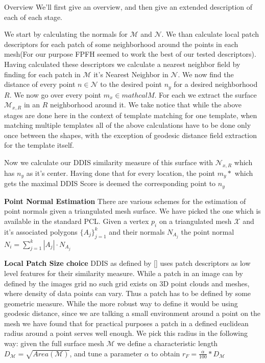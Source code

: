 \documentclass[10pt,twocolumn,letterpaper]{article}
\begin{document}
{\color{red} Overview}
We'll first give an overview, and then give an extended description of each of each stage. 

We start by calculating the normals for $\mathcal{M}$ and $\mathcal{N}$.
We than calculate local patch descriptors for each patch of some neighborhood around the points in each mesh(For our purpose FPFH seemed to work the best of our tested descriptors). 
Having calculated these descriptors we calculate a nearest neighbor field by finding for each patch in $\mathcal{M}$ it's Nearest Neighbor in $\mathcal{N}$. 
We now find the distance of every point $n\in \mathcal{N}$ to the desired point $n_y$ for a desired neighborhood $R$.
 We now go over every point $m_x\in mathcal{M}$. For each we extract the surface $\mathcal{M}_{x,R}$ in an $R$ neighborhood around it.
 We take notice that while the above stages are done here in the context of template matching for one template, when matching multiple templates all of the above calculations have to be done only once between the shapes, with the exception of geodesic distance field extraction for the template itself.
 
 Now we calculate our DDIS similarity measure of this surface with $\mathcal{N}_{x,R}$ which has $n_y$ as it's center. Having done that for every location, the point $m_y*$  which gets the maximal DDIS Score is deemed the corresponding point to $n_y$


\textbf{Point Normal Estimation}
There are various schemes for the estimation of point normals given a triangulated mesh surface. We have picked the one which is available in the standard PCL. Given a vertex $p_i$ on a triangulated mesh $\mathcal{X}$ and it's associated polygons $\{A_j\}_{j=1}^k$ and their normals $N_{A_j}$ the point normal $N_i = \sum_{j=1}^k{|A_j|\cdot N_{A_j}}$

\textbf{Local Patch Size choice}
DDIS as defined by [] uses patch descriptors as low level features for their similarity measure. While a patch in an image can by defined by the images grid no such grid exists on 3D point clouds and meshes, where density of data points can vary. Thus a patch has to be defined by some geometric measure. While the more robust way to define it would be using geodesic distance, since we are talking a small environment around a point on the mesh we have found that for practical purposes a patch in a defined euclidean radius around a point serves well enough. We pick this radius in the following way: given the full surface mesh $\mathcal{M}$ we define a characteristic length $D_\mathcal{M} = \sqrt{Area(\mathcal{M})}$, and tune a parameter $\alpha$ to obtain $r_{F} = \frac{\alpha}{100}*D_\mathcal{M}$
\end{document}
